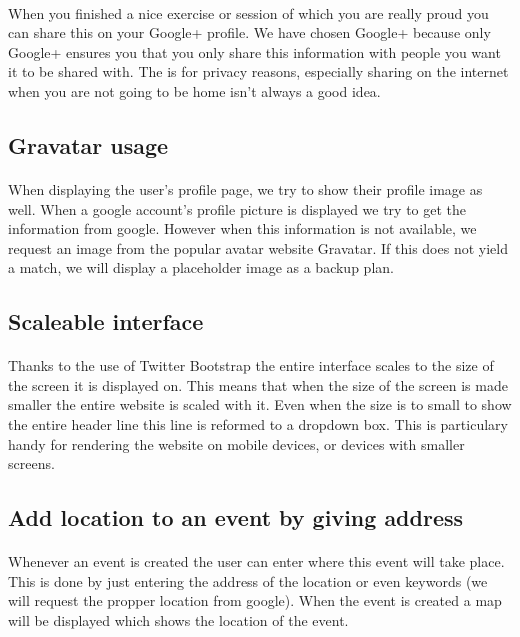 \documentclass[11pt,a4paper]{scrartcl}
\begin{document}
\paragraph{}When you finished a nice exercise or session of which you are really proud you can share this on your Google+ profile. We have chosen Google+ because only Google+ ensures you that you only share this information with people you want it to be shared with. The is for privacy reasons, especially sharing on the internet when you are not going to be home isn't always a good idea.

\subsection{Gravatar usage}
\paragraph{}When displaying the user's profile page, we try to show their profile image as well. When a google account's profile picture is displayed we try to get the information from google. However when this information is not available, we request an image from the popular avatar website Gravatar. If this does not yield a match, we will display a placeholder image as a backup plan.
\subsection{Scaleable interface}
\paragraph{}Thanks to the use of Twitter Bootstrap the entire interface scales to the size of the screen it is displayed on. This means that when the size of the screen is made smaller the entire website is scaled with it. Even when the size is to small to show the entire header line this line is reformed to a dropdown box. This is particulary handy for rendering the website on mobile devices, or devices with smaller screens.
\subsection{Add location to an event by giving address}
\paragraph{}Whenever an event is created the user can enter where this event will take place. This is done by just entering the address of the location or even keywords (we will request the propper location from google). When the event is created a map will be displayed which shows the location of the event.
\end{document}

